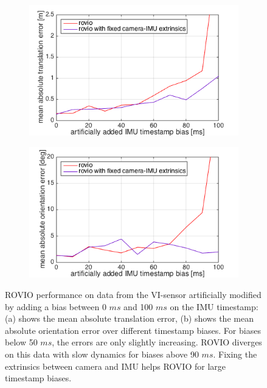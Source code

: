 \begin{figure}[h]
  \begin{subfigure}[b]{0.48\textwidth}
    \includegraphics[width=\textwidth]{images/artificial_bias_1.png}
    \caption{}
  \end{subfigure}
  \hfill
  \begin{subfigure}[b]{0.48\textwidth}
    \includegraphics[width=\textwidth]{images/artificial_bias_2.png}
    \caption{}
  \end{subfigure}
   \caption{ROVIO performance on data from the VI-sensor artificially modified by adding a bias between 0 $ms$ and 100 $ms$ on the IMU timestamp: (a) shows the mean absolute translation error, (b) shows the mean absolute orientation error over different timestamp biases. For biases below 50 $ms$, the errors are only slightly increasing. ROVIO diverges on this data with slow dynamics for biases above 90 $ms$. Fixing the extrinsics between camera and IMU helps ROVIO for large timestamp biases.}
   \label{pics:timesync_artificial}
\end{figure}

